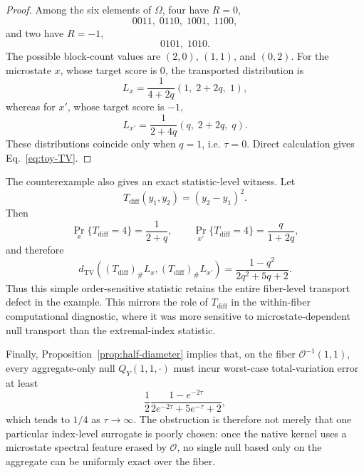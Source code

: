 \begin{proof}
Among the six elements of $\Omega$, four have $R=0$,
\[
0011,\;0110,\;1001,\;1100,
\]
and two have $R=-1$,
\[
0101,\;1010.
\]
The possible block-count values are $(2,0)$, $(1,1)$, and $(0,2)$.  For the
microstate $x$, whose target score is $0$, the transported distribution is
\begin{equation}
L_x
=
\frac{1}{4+2q}
\left(1,\;2+2q,\;1\right),
\label{eq:toy-Lx}
\end{equation}
whereas for $x'$, whose target score is $-1$,
\begin{equation}
L_{x'}
=
\frac{1}{2+4q}
\left(q,\;2+2q,\;q\right).
\label{eq:toy-Lxp}
\end{equation}
These distributions coincide only when $q=1$, i.e. $\tau=0$.  Direct
calculation gives Eq.~\eqref{eq:toy-TV}.
\end{proof}

The counterexample also gives an exact statistic-level witness.  Let
\begin{equation}
T_{\mathrm{diff}}(y_1,y_2)=(y_2-y_1)^2.
\end{equation}
Then
\[
\Pr_x\{T_{\mathrm{diff}}=4\}
=\frac{1}{2+q},
\qquad
\Pr_{x'}\{T_{\mathrm{diff}}=4\}
=\frac{q}{1+2q},
\]
and therefore
\begin{equation}
 d_{\mathrm{TV}}((T_{\mathrm{diff}})_\#L_x,(T_{\mathrm{diff}})_\#L_{x'})
 =
 \frac{1-q^2}{2q^2+5q+2}.
\label{eq:toy-Tdiff-TV}
\end{equation}
Thus this simple order-sensitive statistic retains the entire fiber-level
transport defect in the example.  This mirrors the role of $T_{\mathrm{diff}}$
in the within-fiber computational diagnostic, where it was more sensitive to
microstate-dependent null transport than the extremal-index statistic.

Finally, Proposition~\ref{prop:half-diameter} implies that, on the fiber
$\mathcal O^{-1}(1,1)$, every aggregate-only null $Q_Y(1,1,\cdot)$ must incur
worst-case total-variation error at least
\[
\frac{1}{2}
\frac{1-e^{-2\tau}}
{2e^{-2\tau}+5e^{-\tau}+2},
\]
which tends to $1/4$ as $\tau\to\infty$.  The obstruction is therefore not
merely that one particular index-level surrogate is poorly chosen: once the
native kernel uses a microstate spectral feature erased by $\mathcal O$, no
single null based only on the aggregate can be uniformly exact over the fiber.


